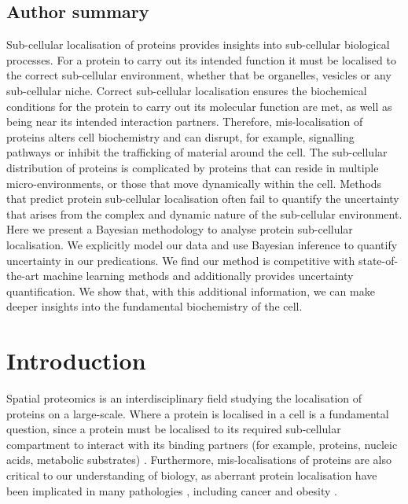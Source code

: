 \documentclass[12pt,english]{article}
\begin{document}
\subsection*{Author summary}

Sub-cellular localisation of proteins provides insights into
sub-cellular biological processes. For a protein to carry out its
intended function it must be localised to the correct sub-cellular
environment, whether that be organelles, vesicles or any sub-cellular
niche. Correct sub-cellular localisation ensures the biochemical
conditions for the protein to carry out its molecular function are
met, as well as being near its intended interaction
partners. Therefore, mis-localisation of proteins alters cell
biochemistry and can disrupt, for example, signalling pathways or
inhibit the trafficking of material around the cell. The sub-cellular
distribution of proteins is complicated by proteins that can reside in
multiple micro-environments, or those that move dynamically within the
cell. Methods that predict protein sub-cellular localisation often
fail to quantify the uncertainty that arises from the complex and
dynamic nature of the sub-cellular environment. Here we present a
Bayesian methodology to analyse protein sub-cellular localisation. We
explicitly model our data and use Bayesian inference to quantify
uncertainty in our predications. We find our
method is competitive with state-of-the-art machine learning methods
and additionally provides uncertainty quantification. We show that, with this
additional information, we can make deeper insights into the
fundamental biochemistry of the cell.


\section{Introduction}\label{Intro}

Spatial proteomics is an interdisciplinary field studying the
localisation of proteins on a large-scale. Where a protein is
localised in a cell is a fundamental question, since a protein must be
localised to its required sub-cellular compartment to interact with
its binding partners (for example, proteins, nucleic acids, metabolic
substrates) \citep{Gibson:2009}. Furthermore, mis-localisations of
proteins are also critical to our understanding of biology, as
aberrant protein localisation have been implicated in many pathologies
\citep{Olkkonen:2006, Luheshi:2008, Laurila:2009, De:2011, Cody:2013},
including cancer \citep{Kau:2004, Rodriguez:2004, Latorre:2005,
  Shin:2013} and obesity \citep{Siljee:2018}.
\end{document}
